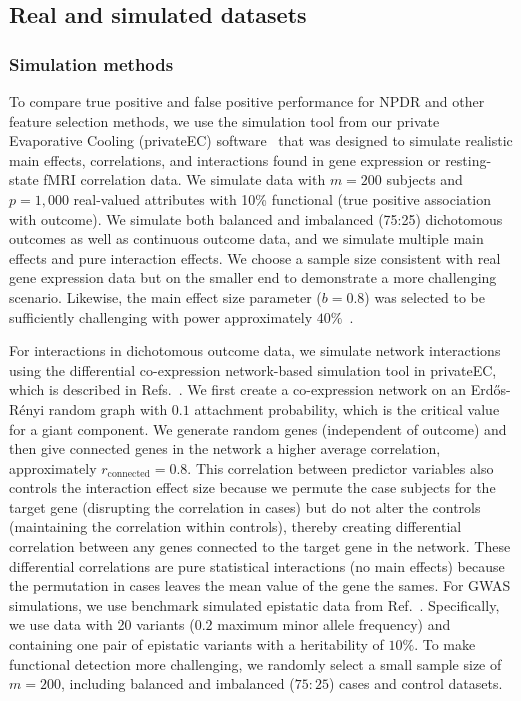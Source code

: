 \documentclass{bioinfo}
\begin{document}
\subsection{Real and simulated datasets}
\subsubsection{Simulation methods}
To compare true positive and false positive performance for NPDR and other feature selection methods, we use the simulation tool from our private Evaporative Cooling (privateEC) software~\citep{le17} that was designed to simulate realistic main effects, correlations, and interactions found in gene expression or resting-state fMRI correlation data.
We simulate data with $m=200$ subjects and $p=1,000$ real-valued attributes with 10\% functional (true positive association with outcome).
We simulate both balanced and imbalanced (75:25) dichotomous outcomes as well as continuous outcome data, and we simulate multiple main effects and pure interaction effects. 
We choose a sample size consistent with real gene expression data but on the smaller end to demonstrate a more challenging scenario.
Likewise, the main effect size parameter ($b=0.8$) was selected to be sufficiently challenging with power approximately $40\%$~\citep{le17}.

For interactions in dichotomous outcome data, we simulate network interactions using the differential co-expression network-based simulation tool in privateEC, which is described in Refs.~\citep{le17, lareau15}.
We first create a co-expression network on an Erd\H{o}s-R\'enyi random graph with $0.1$ attachment probability, which is the critical value for a giant component.
We generate random genes (independent of outcome) and then give connected genes in the network a higher average correlation, approximately $r_{\text{connected}}=0.8$.
This correlation between predictor variables also controls the interaction effect size because we permute the case subjects for the target gene (disrupting the correlation in cases) but do not alter the controls (maintaining the correlation within controls), thereby creating differential correlation between any genes connected to the target gene in the network. These differential correlations are pure statistical interactions (no main effects) because the permutation in cases leaves the mean value of the gene the sames.   
For GWAS simulations, we use benchmark simulated epistatic data from Ref.~\citep{urbanowicz17}. Specifically, we use data with 20 variants ($0.2$ maximum minor allele frequency) and containing one pair of epistatic variants with a heritability of $10\%$. To make functional detection more challenging, we randomly select a small sample size of $m=200$, including balanced and imbalanced ($75:25$) cases and control datasets.
\end{document}
